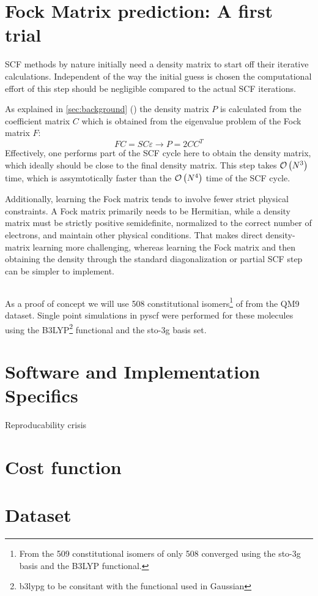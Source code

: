 \section{Fock Matrix prediction: A first trial}
\label{sec:first_predictions}
SCF methods by nature initially need a density matrix to start off their iterative calculations. Independent of the way the initial guess is chosen the computational effort of this step should be negligible compared to the actual SCF iterations. 

As explained in \autoref{sec:background} () the density matrix $P$ is calculated from the coefficient matrix $C$ which is obtained from the eigenvalue problem of the Fock matrix $F$:
\begin{equation}
    FC = SC\varepsilon \rightarrow P = 2CC^T
\end{equation}
Effectively, one performs part of the SCF cycle here to obtain the density matrix, which ideally should be close to the final density matrix. This step takes $\mathcal{O}\left(N^3\right)$ time, which is assymtotically faster than the $\mathcal{O}\left(N^4\right)$ time of the SCF cycle. 

Additionally, learning the Fock matrix tends to involve fewer strict physical constraints. A Fock matrix primarily needs to be Hermitian, while a density matrix must be strictly positive semidefinite, normalized to the correct number of electrons, and maintain other physical conditions. That makes direct density-matrix learning more challenging, whereas learning the Fock matrix and then obtaining the density through the standard diagonalization or partial SCF step can be simpler to implement. 


\subsection{}
\label{subsec:qm9_c5h4n2o2}
As a proof of concept we will use 508 constitutional isomers\footnote{From the 509 constitutional isomers of  only 508 converged using the sto-3g basis and the B3LYP functional.} of  from the QM9 dataset. 
Single point simulations in pyscf  were performed for these molecules using the B3LYP\footnote{b3lypg to be consitant with the functional used in Gaussian} functional and the sto-3g basis set. 

\section{Software and Implementation Specifics}
\label{sec:software_and_implementation}
Reproducability crisis
\section{Cost function}
\section{Dataset}
